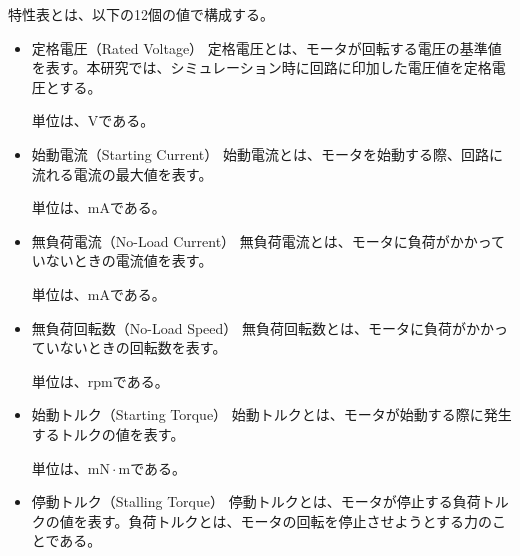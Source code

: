 \documentclass[uplatex, 10pt, a4p]{jsarticle}
\begin{document}
特性表とは、以下の12個の値で構成する。
\begin{itemize}
\item{定格電圧（Rated Voltage）}
定格電圧とは、モータが回転する電圧の基準値を表す。本研究では、シミュレーション時に回路に印加した電圧値を定格電圧とする。

単位は、$\mathrm{V}$である。
\item{始動電流（Starting Current）}\label{sub:sub:sidouden}
始動電流とは、モータを始動する際、回路に流れる電流の最大値を表す。

単位は、$\mathrm{mA}$である。

\item{無負荷電流（No-Load Current）}
無負荷電流とは、モータに負荷がかかっていないときの電流値を表す。

単位は、$\mathrm{mA}$である。

\item{無負荷回転数（No-Load Speed）}
無負荷回転数とは、モータに負荷がかかっていないときの回転数を表す。

単位は、$\mathrm{rpm}$である。

\item{始動トルク（Starting Torque）}
始動トルクとは、モータが始動する際に発生するトルクの値を表す。

単位は、$\mathrm{mN \cdot m}$である。


\item{停動トルク（Stalling Torque）}\label{sub:sub:teidoutoruku}
停動トルクとは、モータが停止する負荷トルクの値を表す。負荷トルクとは、モータの回転を停止させようとする力のことである。


\end{itemize}
\end{document}
